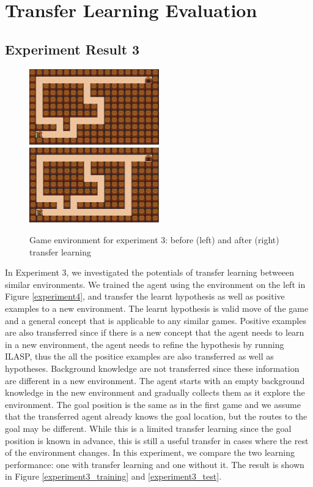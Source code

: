\newpage
\section{Transfer Learning Evaluation}
\label{sec:transfer_learning_evaluation}
\subsection{Experiment Result 3}

\begin{figure}[!htb]
\centerline{
\includegraphics[width=0.5\textwidth]{./figures/experiment3_before}
\includegraphics[width=0.5\textwidth]{./figures/experiment3_after}
}
\caption{Game environment for experiment 3: before (left) and after (right) transfer learning}
\label{experiment3}
\end{figure}

In Experiment 3, we investigated the potentials of transfer learning betweeen similar environments.
We trained the agent using the environment on the left in Figure \ref{experiment4}, and transfer the learnt hypothesis as well as positive examples to a new environment.
The learnt hypothesis is valid move of the game and a general concept that is applicable to any similar games. Positive examples are also transferred since
if there is a new concept that the agent needs to learn in a new environment, the agent needs to refine the hypothesis by running ILASP, thus the all the positice examples
are also transferred as well as hypotheses. Background knowledge are not transferred since these information are different in a new environment.
The agent starts with an empty background knowledge in the new environment and gradually collects them
as it explore the environment. The goal position is the same as in the first game and we assume that the transferred agent already knows the goal location, but the routes to the goal may be different.
While this is a limited transfer learning since the goal position is known in advance, this is still a useful transfer in cases where the rest of the environment changes.
In this experiment, we compare the two learning performance: one with transfer learning and one without it.
The result is shown in Figure \ref{experiment3_training} and \ref{experiment3_test}.

